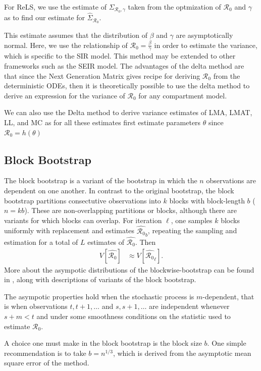 \documentclass[12pt]{article}
\newcommand{\rr}{\ensuremath{\mathcal{R}_0}}
\begin{document}
For ReLS, we use the estimate of $\Sigma_{\rr, \gamma}$ taken from the optmization of $\rr$ and $\gamma$ as to find our estimate for $\hat{\Sigma}_{\rr}$.

This estimate assumes that the distribution of $\beta$ and $\gamma$ are asymptotically normal.  Here, we use the relationship of $\rr = \frac{\beta}{\gamma}$ in order to estimate the variance, which is specific to the SIR model.  This method may be extended to other frameworks such as the SEIR model.  The advantages of the delta method are that since the Next Generation Matrix \citep{diekmann2009} gives recipe for deriving $\rr$ from the deterministic ODEs, then it is theoretically possible to use the delta method to derive an expression for the variance of $\rr$ for any compartment model.

We can also use the Delta method to derive variance estimates of LMA, LMAT, LL, and MC as for all these estimates first estimate parameters $\theta$ since $\rr= h(\theta)$

\subsection{Block Bootstrap}

The block bootstrap is a variant of the bootstrap in which the $n$ observations are dependent on one another.  In contrast to the original bootstrap, the block bootstrap partitions consectutive observations into $k$ blocks with block-length $b$ ($n=kb$).  These are non-overlapping partitions or blocks, although there are variants for which blocks can overlap.  For iteration $\ell$, one samples $k$ blocks uniformly with replacement and estimates $\hat{\rr}_b$, repeating the sampling and estimation for a total of $L$ estimates of $\hat{\rr}$.  Then
\begin{align*}
  V\left [ \hat{\rr} \right ] &\approx V\left [\hat{\rr}_\ell \right ].
\end{align*}
More about the asympotic distributions of the blockwise-bootstrap can be found in \cite{cao1999}, along with descriptions of variants of the block bootstrap.

The asympotic properties hold when the stochastic process is $m$-dependent, that is when observations $t, t+1, \dots$ and $s, s+1, \dots$ are independent whenever $s+m < t$ and under some smoothness conditions on the statistic used to estimate $\rr$.

A choice one must make in the block bootstrap is the block size $b$.  One simple recommendation is to take $b= n^{1/3}$, which is derived from the asymptotic mean square error of the method.
\end{document}
